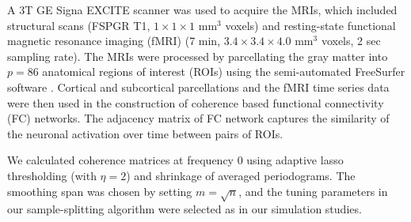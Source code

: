 A 3T GE Signa EXCITE scanner was used to  acquire the MRIs, which included structural scans (FSPGR T1, $1\times 1 \times 1$ mm$^3$ voxels) and resting-state functional magnetic resonance imaging (fMRI) (7 min, $3.4 \times 3.4 \times 4.0$ mm$^3$ voxels, 2 sec sampling rate). The MRIs were processed by parcellating the gray matter into $p=86$ anatomical regions of interest (ROIs) using the semi-automated FreeSurfer software \citep{fischl2000measuring}. Cortical and subcortical parcellations and the fMRI time series data were then used in the construction of coherence based functional connectivity (FC) networks. The adjacency matrix of FC network captures the similarity of the neuronal activation over time between pairs of ROIs. 

We calculated coherence matrices at frequency $0$ using adaptive lasso thresholding (with $\eta = 2$) and shrinkage of averaged periodograms. The smoothing span was chosen by setting $m=\sqrt{n}$, and the tuning parameters in our sample-splitting algorithm were selected as in our simulation studies. 

